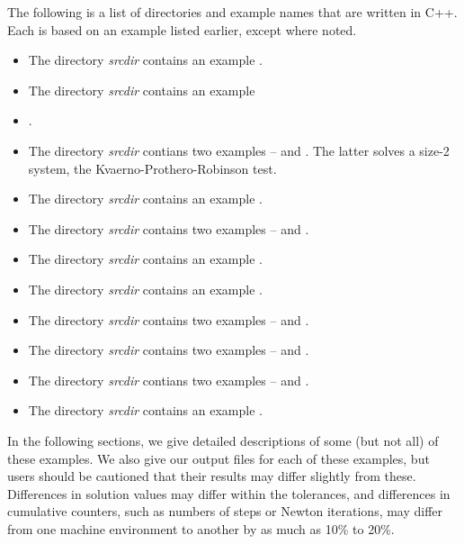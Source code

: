 The following is a list of directories and example names that
are written in C++.  Each is based on an example listed earlier,
except where noted.

\begin{itemize}
\item The directory {\em srcdir}
  contains an example .
\item The directory {\em srcdir}
  contains an example \item {}.
\item The directory {\em srcdir}
  contians two examples --  and .  The latter
  solves a size-2 system, the Kvaerno-Prothero-Robinson test.
\item The directory {\em srcdir}
contains an example .
\item The directory {\em srcdir}
  contains two examples --  and
  .
\item The directory {\em srcdir}
  contains an example .
\item The directory {\em srcdir}
  contains an example .
\item The directory {\em srcdir}
  contains two examples --  and
  .
\item The directory {\em srcdir}
  contains two examples --  and
  .
\item The directory {\em srcdir}
  contians two examples --  and
  .
\item The directory {\em srcdir}
contains an example .

\end{itemize}

\vspace{0.2in}\noindent
In the following sections, we give detailed descriptions of some (but
not all) of these examples.  We also give our output files for
each of these examples, but users should be cautioned that their
results may differ slightly from these.  Differences in solution
values may differ within the tolerances, and differences in cumulative
counters, such as numbers of steps or Newton iterations, may differ
from one machine environment to another by as much as 10\% to 20\%.

